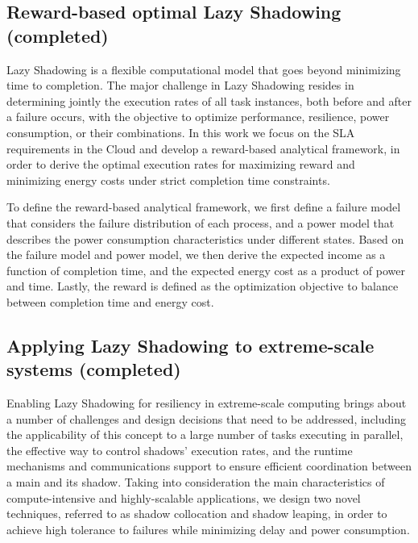 
\subsection{Reward-based optimal Lazy Shadowing (completed)}
Lazy Shadowing is a flexible computational model that goes beyond minimizing time to completion. 
The major challenge in Lazy Shadowing resides in determining jointly the execution rates of all task instances, 
both before and after a failure occurs, with the objective to optimize performance, resilience, power consumption, or their combinations.
In this work we focus on the SLA requirements in the Cloud and develop a reward-based analytical framework, in order to derive the optimal execution rates for maximizing reward and minimizing energy 
costs under strict completion time constraints. 

To define the reward-based analytical framework, we first define a failure model that considers the failure distribution of each process, and a power model that describes the power consumption characteristics under different states. Based on the failure model and power model, we then derive the expected income as a function of completion time, and the expected energy cost as a product of power and time. Lastly, the reward is defined as the optimization objective to balance between completion time and energy cost.  



\subsection{Applying Lazy Shadowing to extreme-scale systems (completed)}

Enabling Lazy Shadowing for resiliency in extreme-scale computing brings about a number of challenges and design decisions 
that need to be addressed, including the applicability of this concept to a large number of tasks executing in parallel, 
the effective way to control shadows’ execution rates, and the runtime mechanisms and communications support to ensure efficient 
coordination between a main and its shadow. Taking into consideration the main characteristics of compute-intensive and 
highly-scalable applications, we design two novel techniques, referred to as shadow collocation and shadow leaping, 
in order to achieve high tolerance to failures while minimizing delay and power consumption.

